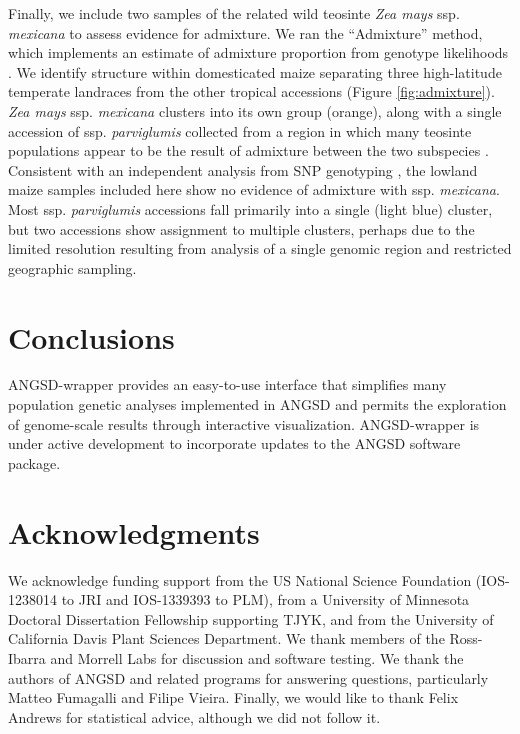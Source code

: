 \documentclass[10pt,a4paper]{article}
\begin{document}
Finally, we include two samples of the related wild teosinte \textit{Zea mays} ssp. \textit{mexicana} to assess evidence for admixture.  
We ran the ``Admixture'' method, which implements an estimate of admixture proportion from genotype likelihoods \citep{pmid24026093}.
We identify structure within domesticated maize separating three high-latitude temperate landraces from the other tropical accessions (Figure \ref{fig:admixture}). 
\textit{Zea mays} ssp. \textit{mexicana} clusters into its own group (orange), along with a single accession of ssp. \textit{parviglumis} collected from a region in which many teosinte populations appear to be the result of admixture between the two subspecies \citep{fang2012megabase}.  
Consistent with an independent analysis from SNP genotyping \citep{hufford2013genomic}, the lowland maize samples included here show no evidence of admixture with ssp. \textit{mexicana}.
Most ssp. \textit{parviglumis} accessions fall primarily into a single (light blue) cluster, but two accessions show assignment to multiple clusters, perhaps due to the limited resolution resulting from analysis of a single genomic region and restricted geographic sampling.

\section*{Conclusions}
ANGSD-wrapper provides an easy-to-use interface that simplifies many population genetic analyses implemented in ANGSD \citep{korneliussen2014angsd} and permits the exploration of genome-scale results through interactive visualization.
ANGSD-wrapper is under active development to incorporate updates to the ANGSD software package.  
\section*{Acknowledgments}
We acknowledge funding support from the US National Science Foundation (IOS-1238014 to JRI and IOS-1339393 to PLM), from a University of Minnesota Doctoral Dissertation Fellowship supporting TJYK, and from the University of California Davis Plant Sciences Department. We thank members of the Ross-Ibarra and Morrell Labs for discussion and software testing. We thank the authors of ANGSD and related programs for answering questions, particularly Matteo Fumagalli and Filipe Vieira. Finally, we would like to thank Felix Andrews for statistical advice, although we did not follow it. 
\clearpage
\singlespacing




\end{document}

